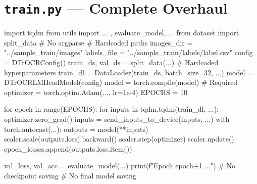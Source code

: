 \documentclass[11pt, a4paper]{report}
\begin{document}
\section{\texttt{train.py} --- Complete Overhaul}
\label{sec:code-train}

\begin{minipage}[t]{0.48\textwidth}
\begin{originalcode}
import tqdm
from utils import ... , evaluate_model, ...
from dataset import split_data
# No argparse
# Hardcoded paths
images_dir = "../sample_train/images"
labels_file = "../sample_train/labels/label.csv"
config = DTrOCRConfig()
train_ds, val_ds = split_data(...)
# Hardcoded hyperparameters
train_dl = DataLoader(train_ds, batch_size=32, ...)
model = DTrOCRLMHeadModel(config)
model = torch.compile(model)  # Required
optimizer = torch.optim.Adam(..., lr=1e-4)
EPOCHS = 10

for epoch in range(EPOCHS):
  for inputs in tqdm.tqdm(train_dl, ...):
    optimizer.zero_grad()
    inputs = send_inputs_to_device(inputs, ...)
    with torch.autocast(...):
      outputs = model(**inputs)
    scaler.scale(outputs.loss).backward()
    scaler.step(optimizer)
    scaler.update()
    epoch_losses.append(outputs.loss.item())

  val_loss, val_acc = evaluate_model(...)
  print(f"Epoch {epoch+1} ...")
  # No checkpoint saving
  # No final model saving
\end{originalcode}
\end{minipage}
\hfill
\end{document}
